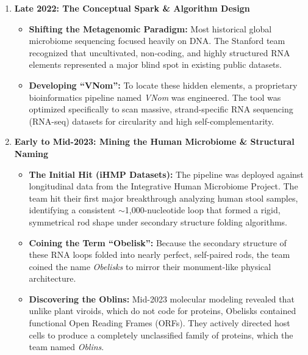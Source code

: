 \documentclass[11pt,a4paper]{article}
\begin{document}
\begin{enumerate}[leftmargin=*, itemsep=1.2em]
    \item \textbf{Late 2022: The Conceptual Spark \& Algorithm Design}
    \begin{itemize}[itemsep=0.3em]
        \item \textbf{Shifting the Metagenomic Paradigm:} Most historical global microbiome sequencing focused heavily on DNA. The Stanford team recognized that uncultivated, non-coding, and highly structured RNA elements represented a major blind spot in existing public datasets.
        \item \textbf{Developing ``VNom'':} To locate these hidden elements, a proprietary bioinformatics pipeline named \textit{VNom} was engineered. The tool was optimized specifically to scan massive, strand-specific RNA sequencing (RNA-seq) datasets for circularity and high self-complementarity.
    \end{itemize}

    \item \textbf{Early to Mid-2023: Mining the Human Microbiome \& Structural Naming}
    \begin{itemize}[itemsep=0.3em]
        \item \textbf{The Initial Hit (iHMP Datasets):} The pipeline was deployed against longitudinal data from the Integrative Human Microbiome Project. The team hit their first major breakthrough analyzing human stool samples, identifying a consistent $\sim$1,000-nucleotide loop that formed a rigid, symmetrical rod shape under secondary structure folding algorithms.
        \item \textbf{Coining the Term ``Obelisk'':} Because the secondary structure of these RNA loops folded into nearly perfect, self-paired rods, the team coined the name \textit{Obelisks} to mirror their monument-like physical architecture.
        \item \textbf{Discovering the Oblins:} Mid-2023 molecular modeling revealed that unlike plant viroids, which do not code for proteins, Obelisks contained functional Open Reading Frames (ORFs). They actively directed host cells to produce a completely unclassified family of proteins, which the team named \textit{Oblins}.
    \end{itemize}


\end{enumerate}
\end{document}
